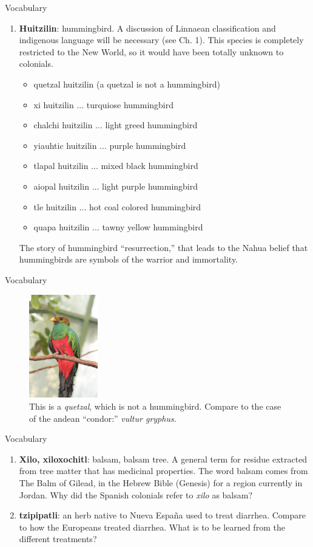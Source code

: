 \documentclass{beamer}
\begin{document}
\begin{frame}{Vocabulary}
\small
\begin{enumerate}
\item \textbf{Huitzilin}: hummingbird.  A discussion of Linnaean classification and indigenous language will be necessary (see Ch. 1).  This species is completely restricted to the New World, so it would have been totally unknown to colonials.
\begin{itemize}
\item quetzal huitzilin (a quetzal is not a hummingbird)
\item xi huitzilin ... turquiose hummingbird
\item chalchi huitzilin ... light greed hummingbird
\item yiauhtic huitzilin ... purple hummingbird
\item tlapal huitzilin ... mixed black hummingbird
\item aiopal huitzilin ... light purple hummingbird
\item tle huitzilin ... hot coal colored hummingbird
\item quapa huitzilin ... tawny yellow hummingbird
\end{itemize}
The story of hummingbird ``resurrection,'' that leads to the Nahua belief that hummingbirds are symbols of the warrior and immortality.
\end{enumerate}
\end{frame}

\begin{frame}{Vocabulary}
\begin{figure}
\includegraphics[width=3cm]{figures/quetzal.jpg}
\caption{This is a \textit{quetzal}, which is not a hummingbird.  Compare to the case of the andean ``condor:'' \textit{vultur gryphus.}}
\end{figure}
\end{frame}

\begin{frame}{Vocabulary}
\small
\begin{enumerate}
\item \textbf{Xilo, xiloxochitl}: balsam, balsam tree.  A general term for residue extracted from tree matter that has medicinal properties.  The word balsam comes from The Balm of Gilead, in the Hebrew Bible (Genesis) for a region currently in Jordan.  Why did the Spanish colonials refer to \textit{xilo} as balsam?
\item \textbf{tzipipatli}: an herb native to Nueva Espa\~{n}a used to treat diarrhea.  Compare to how the Europeans treated diarrhea.  What is to be learned from the different treatments?
\end{enumerate}
\end{frame}
\end{document}
